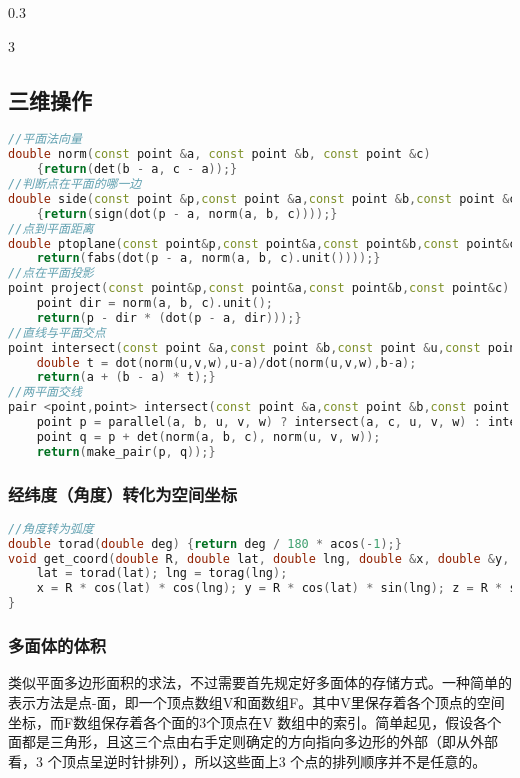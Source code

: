 \documentclass[landscape,a4paper]{article}
\begin{document}
\begin{spacing}{0.3}
\begin{multicols}{3}
\subsection{三维操作}
\begin{lstlisting}[language=C++]
//平面法向量
double norm(const point &a, const point &b, const point &c)
    {return(det(b - a, c - a));}
//判断点在平面的哪一边
double side(const point &p,const point &a,const point &b,const point &c)
    {return(sign(dot(p - a, norm(a, b, c))));}
//点到平面距离
double ptoplane(const point&p,const point&a,const point&b,const point&c) {
    return(fabs(dot(p - a, norm(a, b, c).unit())));}
//点在平面投影
point project(const point&p,const point&a,const point&b,const point&c) {
    point dir = norm(a, b, c).unit();
    return(p - dir * (dot(p - a, dir)));}
//直线与平面交点
point intersect(const point &a,const point &b,const point &u,const point &v,const point &w) {
    double t = dot(norm(u,v,w),u-a)/dot(norm(u,v,w),b-a);
    return(a + (b - a) * t);}
//两平面交线
pair <point,point> intersect(const point &a,const point &b,const point &c,const point &u, const point &v, const point &w) {
    point p = parallel(a, b, u, v, w) ? intersect(a, c, u, v, w) : intersect(a, b, u, v, w);
    point q = p + det(norm(a, b, c), norm(u, v, w));
    return(make_pair(p, q));}
\end{lstlisting}

\subsubsection{经纬度（角度）转化为空间坐标}
\begin{lstlisting}[language=C++]
//角度转为弧度
double torad(double deg) {return deg / 180 * acos(-1);}
void get_coord(double R, double lat, double lng, double &x, double &y, double &z) {
    lat = torad(lat); lng = torag(lng);
    x = R * cos(lat) * cos(lng); y = R * cos(lat) * sin(lng); z = R * sin(lat);
}
\end{lstlisting}
\subsubsection{多面体的体积}
类似平面多边形面积的求法，不过需要首先规定好多面体的存储方式。一种简单的表示方法是点-面，即一个顶点数组V和面数组F。其中V里保存着各个顶点的空间坐标，而F数组保存着各个面的3个顶点在V 数组中的索引。简单起见，假设各个面都是三角形，且这三个点由右手定则确定的方向指向多边形的外部（即从外部看，3 个顶点呈逆时针排列），所以这些面上3 个点的排列顺序并不是任意的。

\end{multicols}
\end{spacing}
\end{document}

